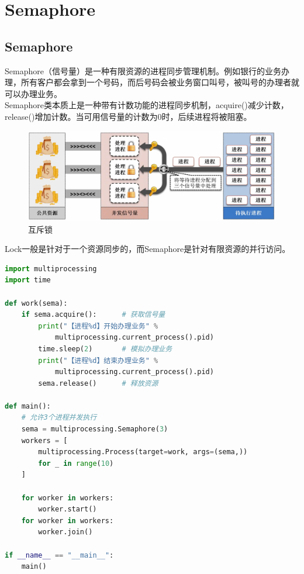 \newpage

\section{Semaphore}

\subsection{Semaphore}

Semaphore（信号量）是一种有限资源的进程同步管理机制。例如银行的业务办理，所有客户都会拿到一个号码，而后号码会被业务窗口叫号，被叫号的办理者就可以办理业务。 \\

Semaphore类本质上是一种带有计数功能的进程同步机制，acquire()减少计数，release()增加计数。当可用信号量的计数为0时，后续进程将被阻塞。

\begin{figure}[H]
	\centering
	\includegraphics[scale=0.6]{img/C2/2-7/1.png}
	\caption{互斥锁}
\end{figure}

Lock一般是针对于一个资源同步的，而Semaphore是针对有限资源的并行访问。 \\

\begin{lstlisting}[language=Python]
import multiprocessing
import time

def work(sema):
	if sema.acquire():      # 获取信号量
		print("【进程%d】开始办理业务" % 
			multiprocessing.current_process().pid)
		time.sleep(2)       # 模拟办理业务
		print("【进程%d】结束办理业务" % 
			multiprocessing.current_process().pid)
		sema.release()      # 释放资源

def main():
	# 允许3个进程并发执行
	sema = multiprocessing.Semaphore(3)
	workers = [
		multiprocessing.Process(target=work, args=(sema,))
		for _ in range(10)
	]

	for worker in workers:
		worker.start()
	for worker in workers:
		worker.join()

if __name__ == "__main__":
	main()
\end{lstlisting}

